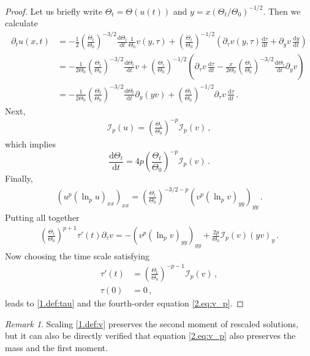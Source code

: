 \documentclass[12pt]{amsart}
\let\pa\partial
\newcommand{\dd}{{\mathrm{d}}}
\newcommand{\M}{\Theta}
\newcommand{\I}{\mathcal{I}}
\theoremstyle{plain}
\theoremstyle{definition}
\theoremstyle{remark}
\newtheorem{remark}{Remark}[section]
\begin{document}
\begin{proof}
Let us briefly write $\M_t = \M(u(t))$ and $y = x (\M_t/\M_0)^{-1/2}$. Then we calculate
    \begin{align*}
        \pa_t u(x,t) &= -\frac12\left(\frac{\M_t}{\M_0}\right)^{-3/2}\frac{\dd \M_t}{\dd t}\frac{1}{\M_0}v(y,\tau) + \left(\frac{\M_t}{\M_0}\right)^{-1/2}\left(\pa_\tau v(y,\tau) \frac{\dd \tau}{\dd t} + \pa_yv\,\frac{\dd y}{\dd t}\right)\\
        &= -\frac{1}{2\M_0}\left(\frac{\M_t}{\M_0}\right)^{-3/2}\frac{\dd \M_t}{\dd t}v + \left(\frac{\M_t}{\M_0}\right)^{-1/2}\left(\pa_\tau v\, \frac{\dd \tau}{\dd t} - \frac{x}{2\M_0} \left(\frac{\M_t}{\M_0}\right)^{-3/2}\frac{\dd \M_t}{\dd t}\pa_y v\right)\\
        &= -\frac{1}{2\M_0} \left(\frac{\M_t}{\M_0}\right)^{-3/2}\frac{\dd \M_t}{\dd t}\pa_y(y v) + \left(\frac{\M_t}{\M_0}\right)^{-1/2}\pa_\tau v\, \frac{\dd \tau}{\dd t}\,.
    \end{align*}
    Next,
    \begin{align*}
        \I_p(u) = \left(\frac{\M_t}{\M_0}\right)^{-p}\I_p(v)\,,
    \end{align*}
    which implies
    \begin{equation*}
        \frac{\dd \M_t}{\dd t} = 4p \left(\frac{\M_t}{\M_0}\right)^{-p}\I_p(v)\,.
    \end{equation*}
    Finally,
    \begin{align*}
        \left(u^p\left(\ln_{p}u\right)_{xx}\right)_{xx} = \left(\frac{\M_t}{\M_0}\right)^{-3/2 -p}\left(v^p\left(\ln_{p}v\right)_{yy}\right)_{yy}\,.
    \end{align*}
    Putting all together
    \begin{align*}
        \left(\frac{\M_t}{\M_0}\right)^{p + 1}\tau'(t)\pa_\tau v = - \left(v^p\left(\ln_{p}v\right)_{yy}\right)_{yy} + \frac{2p}{\M_0}\I_p(v)(y v)_y\,.
    \end{align*}
    Now choosing the time scale satisfying
    \begin{align*}
        \tau'(t) &= \left(\frac{\M_t}{\M_0}\right)^{-p - 1}\I_p(v)\,,\\
        \tau(0) &= 0\,,
    \end{align*}
    leads to \eqref{1.def:tau} and the fourth-order equation \eqref{2.eq:v_p}.
\end{proof}
\begin{remark}
 Scaling \eqref{1.def:v} preserves the second moment of rescaled solutions, but it can also be directly verified that equation \eqref{2.eq:v_p} also preserves the mass and the first moment.
\end{remark}
\end{document}
